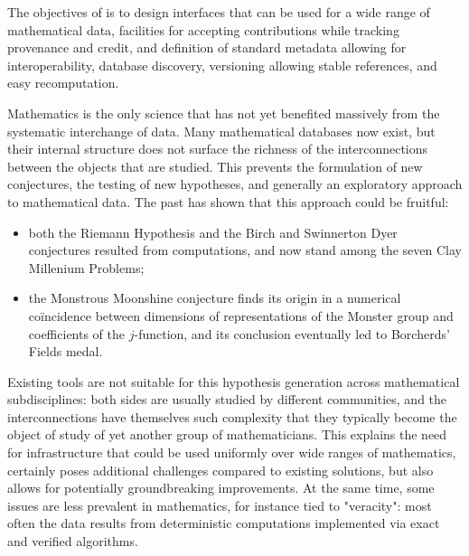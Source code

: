 \addtocounter{wpno}{1}
\begin{Workpackage}{\thewpno}
\WPTitle{\wpname{\thewpno}}

\begin{WPObjectives}
  The objectives of \theWP{} is to design interfaces that can be used
  for a wide range of mathematical data, facilities for accepting
  contributions while tracking provenance and credit, and definition of standard
  metadata allowing for interoperability, database discovery, 
  versioning allowing stable references, and easy recomputation.
  
\end{WPObjectives}


\begin{WPDescription}
Mathematics is the only science that has not yet benefited massively from the systematic interchange of data. Many mathematical databases now exist, but their internal structure does not surface the richness of the interconnections between the objects that are studied. This prevents the formulation of new conjectures, the testing of new hypotheses, and generally an exploratory approach to mathematical data. The past has shown that this approach could be fruitful: 
\begin{itemize}
\item both the Riemann Hypothesis and the Birch and Swinnerton Dyer conjectures resulted from computations, and now stand among the seven Clay Millenium Problems;
\item the Monstrous Moonshine conjecture finds its origin in a numerical co\"incidence between dimensions of representations of the Monster group and coefficients of the $j$-function, and its conclusion eventually led to Borcherds' Fields medal.
\end{itemize}

Existing tools are not suitable for this hypothesis generation across mathematical subdisciplines: both sides are usually studied by different communities, and the interconnections have themselves such complexity that they typically become the object of study of yet another group of mathematicians. This explains the need for infrastructure that could be used uniformly over wide ranges of mathematics, certainly poses additional challenges compared to existing solutions, but also allows for potentially groundbreaking improvements. At the same time, some issues are less prevalent in mathematics, for instance tied to "veracity": most often the data results from deterministic computations implemented via exact and verified algorithms. 


\end{WPDescription}
\end{Workpackage}
